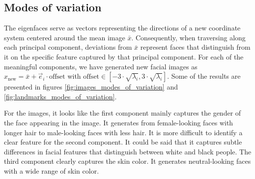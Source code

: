 \documentclass{article}
\begin{document}
\subsection{Modes of variation}

The eigenfaces serve as vectors representing the directions of a new coordinate system centered around the mean image $\bar{x}$. Consequently, when traversing along each principal component, deviations from $\bar{x}$ represent faces that distinguish from it on the specific feature captured by that principal component. For each of the meaningful components, we have generated new facial images as $x_\text{new} = \bar{x} + \vec{e}_i \cdot \text{offset}$ with $\text{offset} \in \left[-3 \cdot \sqrt{\lambda_i}, 3 \cdot \sqrt{\lambda_i}\right]$. Some of the results are presented in figures \ref{fig:images_modes_of_variation} and \ref{fig:landmarks_modes_of_variation}.

For the images, it looks like the first component mainly captures the gender of the face appearing in the image. It generates from female-looking faces with longer hair to male-looking faces with less hair. It is more difficult to identify a clear feature for the second component. It could be said that it captures subtle differences in facial features that distinguish between white and black people. The third component clearly captures the skin color. It generates neutral-looking faces with a wide range of skin color.
\end{document}
